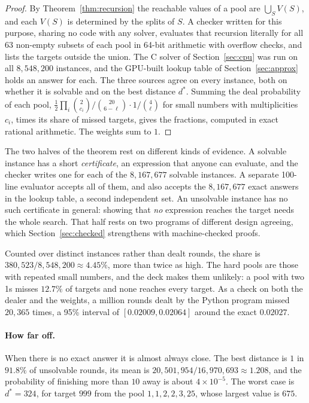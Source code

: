 \documentclass[11pt,a4paper]{article}
\theoremstyle{definition}
\theoremstyle{remark}
\begin{document}
\begin{proof}
By Theorem~\ref{thm:recursion} the reachable values of a pool are $\bigcup_S V(S)$, and each $V(S)$ is
determined by the splits of $S$. A checker written for this purpose, sharing no code with any solver,
evaluates that recursion literally for all 63 non-empty subsets of each pool in 64-bit arithmetic with
overflow checks, and lists the targets outside the union. The C solver of Section~\ref{sec:cpu} was run on
all $8{,}548{,}200$ instances, and the GPU-built lookup table of Section~\ref{sec:approx} holds an answer for
each. The three sources agree on every instance, both on whether it is solvable and on the best distance
$d^*$. Summing the deal probability of each pool, $\tfrac12 \prod_i \binom{2}{c_i} / \binom{20}{6-\ell}
\cdot 1/\binom{4}{\ell}$ for small numbers with multiplicities $c_i$, times its share of missed targets,
gives the fractions, computed in exact rational arithmetic. The weights sum to $1$.
\end{proof}

The two halves of the theorem rest on different kinds of evidence. A solvable instance has a short
\emph{certificate}, an expression that anyone can evaluate, and the checker writes one for each of the
$8{,}167{,}677$ solvable instances. A separate 100-line evaluator accepts all of them, and also accepts the
$8{,}167{,}677$ exact answers in the lookup table, a second independent set. An unsolvable instance has no
such certificate in general: showing that \emph{no} expression reaches the target needs the whole search.
That half rests on two programs of different design agreeing, which Section~\ref{sec:checked} strengthens
with machine-checked proofs.

Counted over distinct instances rather than dealt rounds, the share is $380{,}523 / 8{,}548{,}200 \approx 4.45\%$,
more than twice as high. The hard pools are those with repeated small numbers, and the deck makes them
unlikely: a pool with two 1s misses $12.7\%$ of targets and none reaches every target. As a check on both
the dealer and the weights, a million rounds dealt by the Python program missed $20{,}365$ times, a 95\%
interval of $[0.02009, 0.02064]$ around the exact $0.02027$.

\paragraph{How far off.}
When there is no exact answer it is almost always close. The best distance is $1$ in $91.8\%$ of unsolvable
rounds, its mean is $20{,}501{,}954 / 16{,}970{,}693 \approx 1.208$, and the probability of finishing more than
$10$ away is about $4 \times 10^{-5}$. The worst case is $d^* = 324$, for target $999$ from the pool
$1, 1, 2, 2, 3, 25$, whose largest value is $675$.
\end{document}
